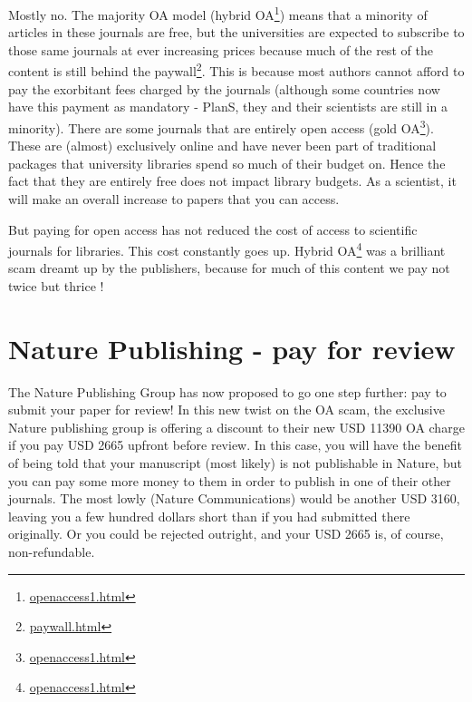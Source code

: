 \documentclass[
]{krantz}
\renewcommand{\href}[2]{#2\footnote{\url{#1}}}
\begin{document}
Mostly no. The majority OA model (\href{openaccess1.html}{hybrid OA}) means that a minority of articles in these journals are free, but the universities are expected to subscribe to those same journals at ever increasing prices because much of the rest of the content is still behind the \href{paywall.html}{paywall}. This is because most authors cannot afford to pay the exorbitant fees charged by the journals (although some countries now have this payment as mandatory - PlanS, they and their scientists are still in a minority). There are some journals that are entirely open access (\href{openaccess1.html}{gold OA}). These are (almost) exclusively online and have never been part of traditional packages that university libraries spend so much of their budget on. Hence the fact that they are entirely free does not impact library budgets. As a scientist, it will make an overall increase to papers that you can access.

But paying for open access has not reduced the cost of access to scientific journals for libraries. This cost constantly goes up. \href{openaccess1.html}{Hybrid OA} was a brilliant scam dreamt up by the publishers, because for much of this content we pay not twice but thrice \citep{buranyi2017staggeringly}!

\hypertarget{nature-publishing---pay-for-review}{%
\section{Nature Publishing - pay for review}\label{nature-publishing---pay-for-review}}

The Nature Publishing Group has now proposed to go one step further: pay to submit your paper for review! In this new twist on the OA scam, the exclusive Nature publishing group is offering a discount to their new USD 11390 OA charge if you pay USD 2665 upfront before review. In this case, you will have the benefit of being told that your manuscript (most likely) is not publishable in Nature, but you can pay some more money to them in order to publish in one of their other journals. The most lowly (Nature Communications) would be another USD 3160, leaving you a few hundred dollars short than if you had submitted there originally. Or you could be rejected outright, and your USD 2665 is, of course, non-refundable.
\end{document}
